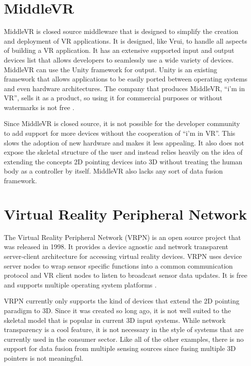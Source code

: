 \section{MiddleVR}

MiddleVR is closed source middleware that is designed to simplify the creation and deployment of VR applications. It is designed, like Vrui, to handle all aspects of building a VR application. It has an extensive supported input and output devices list that allows developers to seamlessly use a wide variety of devices. MiddleVR can use the Unity framework for output. Unity is an existing framework that allows applications to be easily ported between operating systems and even hardware architectures. The company that produces MiddleVR, “i’m in VR”, sells it as a product, so using it for commercial purposes or without watermarks is not free \cite{middle_vr}.

Since MiddleVR is closed source, it is not possible for the developer community to add support for more devices without the cooperation of “i’m in VR”. This slows the adoption of new hardware and makes it less appealing. It also does not expose the skeletal structure of the user and instead relies heavily on the idea of extending the concepts 2D pointing devices into 3D without treating the human body as a controller by itself. MiddleVR also lacks any sort of data fusion framework.

\section{Virtual Reality Peripheral Network}

The Virtual Reality Peripheral Network (VRPN) is an open source project that was released in 1998. It provides a device agnostic and network transparent server-client architecture for accessing virtual reality devices. VRPN uses device server nodes to wrap sensor specific functions into a common communication protocol and VR client nodes to listen to broadcast sensor data updates. It is free and supports multiple operating system platforms \cite{vrpn}.

VRPN currently only supports the kind of devices that extend the 2D pointing paradigm to 3D. Since it was created so long ago, it is not well suited to the skeletal model that is popular in current 3D input systems. While network transparency is a cool feature, it is not necessary in the style of systems that are currently used in the consumer sector. Like all of the other examples, there is no support for data fusion from multiple sensing sources since fusing multiple 3D pointers is not meaningful.